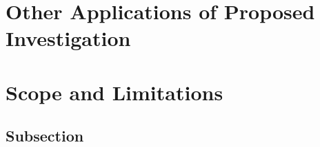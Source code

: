 \section{Other Applications of Proposed Investigation}
\label{sec:ch1.applications}

\section{Scope and Limitations}
\label{sec:ch1.scope}

\subsection{Subsection}
\label{subsec:ch1.section1.subsec1}

